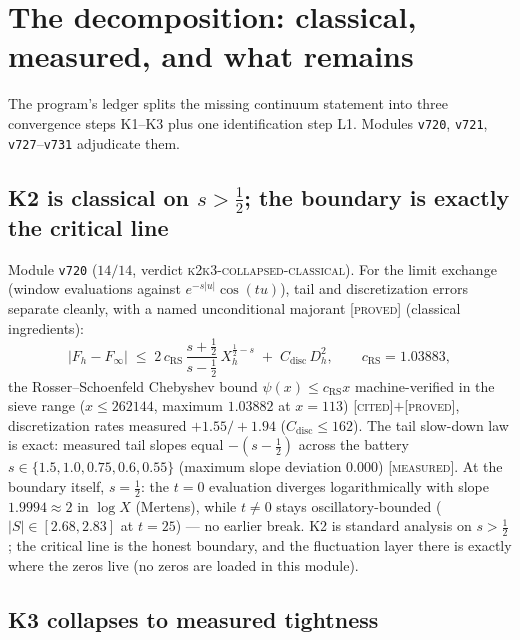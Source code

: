 \documentclass[11pt,a4paper]{article}
\theoremstyle{remark}
\newcommand{\PROVED}{\textnormal{[\textsc{proved}]}}
\newcommand{\MEASURED}{\textnormal{[\textsc{measured}]}}
\newcommand{\CITED}{\textnormal{[\textsc{cited}]}}
\begin{document}
\section{The decomposition: classical, measured, and what
remains}\label{sec:decomp}

The program's ledger splits the missing continuum statement into
three convergence steps K1--K3 plus one identification step L1.
Modules \texttt{v720}, \texttt{v721}, \texttt{v727}--\texttt{v731}
adjudicate them.

\subsection{K2 is classical on \texorpdfstring{$s>\tfrac12$}{s>1/2};
the boundary is exactly the critical line}\label{sec:k2}

Module \texttt{v720} ($14/14$, verdict
\textsc{k2k3-collapsed-classical}).  For the limit exchange
(window evaluations against $e^{-s|u|}\cos(tu)$), tail and
discretization errors separate cleanly, with a named unconditional
majorant \PROVED{} (classical ingredients):
\[
|F_h-F_\infty|\;\le\;2\,c_{\mathrm{RS}}\,
\frac{s+\tfrac12}{s-\tfrac12}\,X_h^{\frac12-s}\;+\;C_{\mathrm{disc}}
\,D_h^2,
\qquad c_{\mathrm{RS}}=1.03883,
\]
the Rosser--Schoenfeld Chebyshev bound $\psi(x)\le c_{\mathrm{RS}}x$
machine-verified in the sieve range ($x\le262144$, maximum
$1.03882$ at $x=113$) \CITED$+$\PROVED, discretization rates
measured $+1.55/+1.94$ ($C_{\mathrm{disc}}\le162$).  The tail
slow-down law is exact: measured tail slopes equal $-(s-\tfrac12)$
across the battery $s\in\{1.5,1.0,0.75,0.6,0.55\}$ (maximum slope
deviation $0.000$) \MEASURED.  At the boundary itself, $s=\tfrac12$:
the $t=0$ evaluation diverges logarithmically with slope
$1.9994\approx2$ in $\log X$ (Mertens), while $t\neq0$ stays
oscillatory-bounded ($|S|\in[2.68,2.83]$ at $t=25$) --- no earlier
break.  K2 is standard analysis on $s>\tfrac12$; the critical line
is the honest boundary, and the fluctuation layer there is exactly
where the zeros live (no zeros are loaded in this module).

\subsection{K3 collapses to measured tightness}\label{sec:k3}
\end{document}
